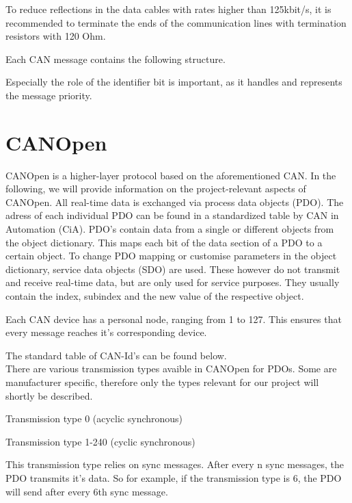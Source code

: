 To reduce reflections in the data cables with rates higher than 125kbit/s, it is recommended to terminate the ends of the communication lines with termination resistors with 120 Ohm. 

Each CAN message contains the following structure.

Especially the role of the identifier bit is important, as it handles and represents the message priority.

\pagebreak

\section{CANOpen}

CANOpen is a higher-layer protocol based on the aforementioned CAN. In the following, we will provide information on the project-relevant aspects of CANOpen.
All real-time data is exchanged via process data objects (PDO). The adress of each individual PDO can be found in a standardized table by CAN in Automation (CiA). PDO's contain data from a single or different objects from the object dictionary. This maps each bit of the data section of a PDO to a certain object. 
To change PDO mapping or customise parameters in the object dictionary, service data objects (SDO) are used. These however do not transmit and receive real-time data, but are only used for service purposes. They usually contain the index, subindex and the new value of the respective object.

Each CAN device has a personal node, ranging from 1 to 127. This ensures that every message reaches it's corresponding device.

The standard table of CAN-Id's can be found below.
\\

There are various transmission types avaible in CANOpen for PDOs. Some are manufacturer specific, therefore only the types relevant for our project will shortly be described.

Transmission type 0 (acyclic synchronous)


Transmission type 1-240 (cyclic synchronous)

This transmission type relies on sync messages. After every n sync messages, the PDO transmits it's data. So for example, if the transmission type is 6, the PDO will send after every 6th sync message.

